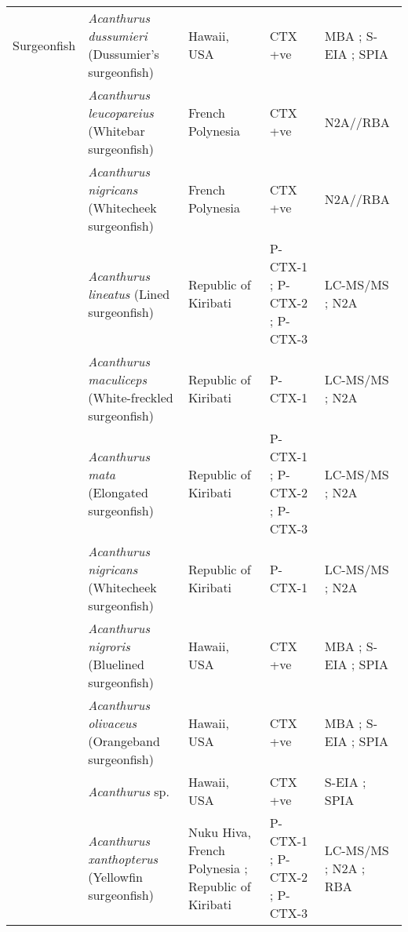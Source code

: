 \documentclass[12pt]{article}
\begin{document}
\begin{longtable}[l]{ | p{2cm} | p{3cm} | p{4.5cm} | p{2cm} | p{3cm} | }
	\hline
	Surgeonfish &\emph{Acanthurus dussumieri} (Dussumier's surgeonfish) & Hawaii, USA \cite{hokama1993evaluation} & CTX +ve \cite{hokama1993evaluation} & MBA \cite{hokama1993evaluation}; S-EIA \cite{hokama1993evaluation}; SPIA \cite{hokama1993evaluation} \\
	& \emph{Acanthurus leucopareius} (Whitebar surgeonfish) & French Polynesia \cite{chinain2014mail} & CTX +ve \cite{chinain2014mail} & N2A//RBA \cite{chinain2014mail} \\ & \emph{Acanthurus nigricans} (Whitecheek surgeonfish) & French Polynesia \cite{chinain2014mail} & CTX +ve \cite{chinain2014mail} & N2A//RBA \cite{chinain2014mail} \\
	& \emph{Acanthurus lineatus} (Lined surgeonfish) & Republic of Kiribati \cite{mak2013pacific} & P-CTX-1 \cite{mak2013pacific}; P-CTX-2 \cite{mak2013pacific}; P-CTX-3 \cite{mak2013pacific} & LC-MS/MS \cite{mak2013pacific}; N2A \cite{mak2013pacific} \\
	& \emph{Acanthurus maculiceps} (White-freckled surgeonfish) & Republic of Kiribati \cite{mak2013pacific} & P-CTX-1 \cite{mak2013pacific} & LC-MS/MS \cite{mak2013pacific}; N2A \cite{mak2013pacific} \\
		&  \emph{Acanthurus mata} (Elongated surgeonfish) & Republic of Kiribati \cite{mak2013pacific} & P-CTX-1 \cite{mak2013pacific}; P-CTX-2 \cite{mak2013pacific}; P-CTX-3 \cite{mak2013pacific} & LC-MS/MS \cite{mak2013pacific}; N2A \cite{mak2013pacific} \\
	& \emph{Acanthurus nigricans} (Whitecheek surgeonfish) & Republic of Kiribati \cite{mak2013pacific} & P-CTX-1 \cite{mak2013pacific}& LC-MS/MS \cite{mak2013pacific}; N2A \cite{mak2013pacific} \\
	& \emph{Acanthurus nigroris} (Bluelined surgeonfish) & Hawaii, USA \cite{hokama1993evaluation} & CTX +ve \cite{hokama1993evaluation} & MBA \cite{hokama1993evaluation}; S-EIA \cite{hokama1993evaluation}; SPIA \cite{hokama1993evaluation} \\
	& \emph{Acanthurus olivaceus} (Orangeband surgeonfish) & Hawaii, USA \cite{hokama1993evaluation} & CTX +ve \cite{hokama1993evaluation} & MBA \cite{hokama1993evaluation}; S-EIA \cite{hokama1993evaluation}; SPIA \cite{hokama1993evaluation} \\
	& \emph{Acanthurus }sp. & Hawaii, USA \cite{hokama1990simplified} & CTX +ve \cite{hokama1990simplified} & S-EIA \cite{hokama1990simplified}; SPIA \cite{hokama1990simplified} \\
	& \emph{Acanthurus xanthopterus} (Yellowfin surgeonfish) & Nuku Hiva, French Polynesia \cite{darius2007ciguatera}; Republic of Kiribati \cite{mak2013pacific} &  P-CTX-1 \cite{mak2013pacific}; P-CTX-2 \cite{mak2013pacific}; P-CTX-3 \cite{mak2013pacific} & LC-MS/MS \cite{mak2013pacific}; N2A \cite{mak2013pacific}; RBA \cite{darius2007ciguatera}\\

\end{longtable}
\end{document}
